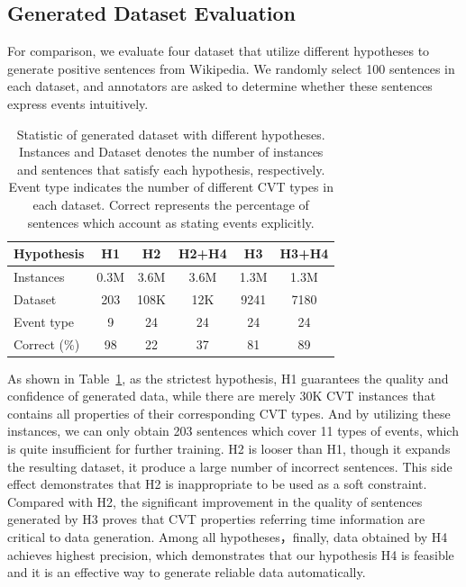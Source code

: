 \documentclass{article}
\begin{document}
\subsection{Generated Dataset Evaluation}\label{sec:evalhypo}
For comparison, we evaluate four dataset that utilize different hypotheses to generate positive sentences from Wikipedia. We randomly select 100 sentences in each dataset, and annotators are asked to determine whether these sentences express events intuitively. 

\begin{table}[h]
\centering
\begin{tabular}{|l|c|c|c|c|c|} \hline
	Hypothesis & H1 & H2 & H2+H4 & H3 & H3+H4 \\ \hline
	Instances & 0.3M & 3.6M & 3.6M & 1.3M & 1.3M \\ \hline
	Dataset & 203 & 108K & 12K & 9241 & 7180 \\ \hline
	Event type & 9 & 24 & 24 & 24 & 24 \\ \hline
	Correct (\%) & 98 & 22 & 37 & 81 & 89 \\ \hline
\end{tabular}
\caption{Statistic of generated dataset with different hypotheses. Instances and Dataset denotes the number of instances and sentences that satisfy each hypothesis, respectively. Event type indicates the number of different CVT types in each dataset. Correct represents the percentage of sentences which account as stating events explicitly. \label{tab:3}}
\end{table}

As shown in Table~\ref{tab:3}, as the strictest hypothesis, H1 guarantees the quality and confidence of generated data, while there are merely 30K CVT instances that contains all properties of their corresponding CVT types. And by utilizing these instances, we can only obtain 203 sentences which cover 11 types of events, which is quite insufficient for further training. H2 is looser than H1, though it expands the resulting dataset, it produce a large number of incorrect sentences. This side effect  demonstrates that H2 is inappropriate to be used as a soft constraint. Compared with H2, the significant improvement in the quality of sentences generated by H3 proves that CVT properties referring time information are critical to data generation. Among all hypotheses，finally, data obtained by H4 achieves highest precision, which demonstrates that our hypothesis H4 is feasible and it is an effective way to generate reliable data automatically.
\end{document}

